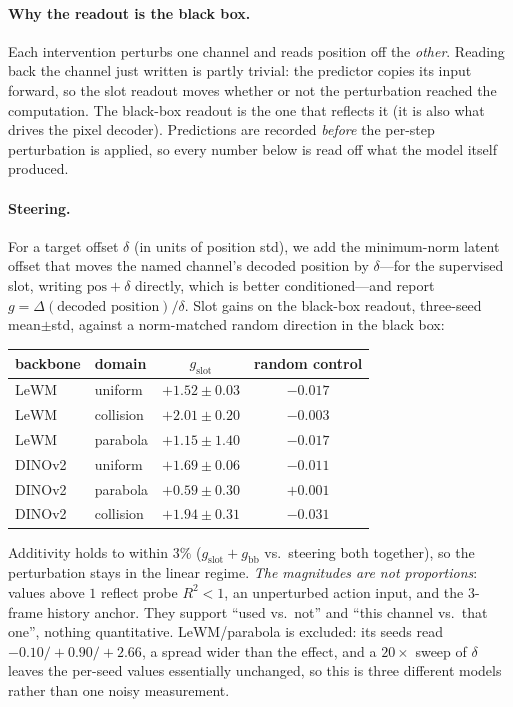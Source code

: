 \paragraph{Why the readout is the black box.}
Each intervention perturbs one channel and reads position off the \emph{other}. Reading back the channel just written is partly trivial: the predictor copies its input forward, so the slot readout moves whether or not the perturbation reached the computation. The black-box readout is the one that reflects it (it is also what drives the pixel decoder). Predictions are recorded \emph{before} the per-step perturbation is applied, so every number below is read off what the model itself produced.

\paragraph{Steering.}
For a target offset $\delta$ (in units of position std), we add the minimum-norm latent offset that moves the named channel's decoded position by $\delta$---for the supervised slot, writing $\text{pos}{+}\delta$ directly, which is better conditioned---and report $g=\Delta(\text{decoded position})/\delta$. Slot gains on the black-box readout, three-seed mean$\pm$std, against a norm-matched random direction in the black box:

\begin{center}\small
\begin{tabular}{@{}llcc@{}}
\toprule
backbone & domain & $g_{\mathrm{slot}}$ & random control \\
\midrule
LeWM & uniform & $+1.52{\pm}0.03$ & $-0.017$ \\
LeWM & collision & $+2.01{\pm}0.20$ & $-0.003$ \\
LeWM & parabola & $+1.15{\pm}1.40$ & $-0.017$ \\
DINOv2 & uniform & $+1.69{\pm}0.06$ & $-0.011$ \\
DINOv2 & parabola & $+0.59{\pm}0.30$ & $+0.001$ \\
DINOv2 & collision & $+1.94{\pm}0.31$ & $-0.031$ \\
\bottomrule
\end{tabular}
\end{center}

Additivity holds to within $3\%$ ($g_{\mathrm{slot}}{+}g_{\mathrm{bb}}$ vs.\ steering both together), so the perturbation stays in the linear regime. \emph{The magnitudes are not proportions}: values above $1$ reflect probe $R^{2}{<}1$, an unperturbed action input, and the $3$-frame history anchor. They support ``used vs.\ not'' and ``this channel vs.\ that one'', nothing quantitative. LeWM/parabola is excluded: its seeds read $-0.10/+0.90/+2.66$, a spread wider than the effect, and a $20\times$ sweep of $\delta$ leaves the per-seed values essentially unchanged, so this is three different models rather than one noisy measurement.


